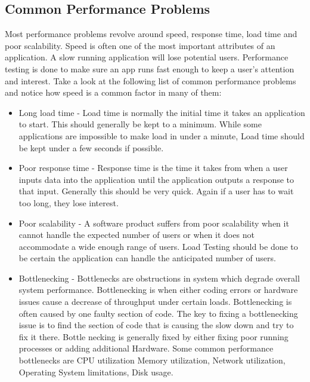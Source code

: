 \documentclass[../thesis.tex]{subfiles}
\begin{document}
	\subsection*{Common Performance Problems}
	Most performance problems revolve around speed, response time, load time and poor scalability. Speed is often one of the most important attributes of an application. A slow running application will lose potential users. Performance testing is done to make sure an app runs fast enough to keep a user's attention and interest. Take a look at the following list of common performance problems and notice how speed is a common factor in many of them:
	\newline
    
	\begin{itemize}
		\item Long load time - Load time is normally the initial time it takes an application to start. This should generally be kept to a minimum. While some applications are impossible to make load in under a minute, Load time should be kept under a few seconds if possible.
		\newline
    
		\item Poor response time - Response time is the time it takes from when a user inputs data into the application until the application outputs a response to that input. Generally this should be very quick. Again if a user has to wait too long, they lose interest.
		\newline
    
		\item Poor scalability - A software product suffers from poor scalability when it cannot handle the expected number of users or when it does not accommodate a wide enough range of users. Load Testing should be done to be certain the application can handle the anticipated number of users.
		\newline
    
		\item Bottlenecking - Bottlenecks are obstructions in system which degrade overall system performance. Bottlenecking is when either coding errors or hardware issues cause a decrease of throughput under certain loads. Bottlenecking is often caused by one faulty section of code. The key to fixing a bottlenecking issue is to find the section of code that is causing the slow down and try to fix it there. Bottle necking is generally fixed by either fixing poor running processes or adding additional Hardware. Some common performance bottlenecks are CPU utilization
		Memory utilization, Network utilization, Operating System limitations, Disk usage.
	\end{itemize}
\end{document}
